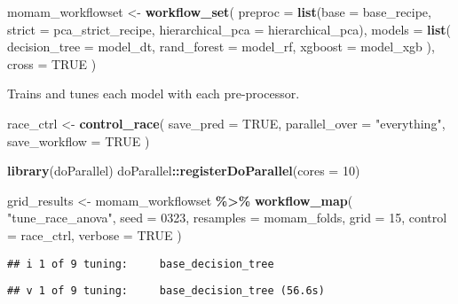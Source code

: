 \documentclass[
]{article}
\newenvironment{Shaded}{\begin{snugshade}}{\end{snugshade}}
\newcommand{\AttributeTok}[1]{\textcolor[rgb]{0.13,0.29,0.53}{#1}}
\newcommand{\ConstantTok}[1]{\textcolor[rgb]{0.56,0.35,0.01}{#1}}
\newcommand{\DecValTok}[1]{\textcolor[rgb]{0.00,0.00,0.81}{#1}}
\newcommand{\FunctionTok}[1]{\textcolor[rgb]{0.13,0.29,0.53}{\textbf{#1}}}
\newcommand{\NormalTok}[1]{#1}
\newcommand{\OtherTok}[1]{\textcolor[rgb]{0.56,0.35,0.01}{#1}}
\newcommand{\SpecialCharTok}[1]{\textcolor[rgb]{0.81,0.36,0.00}{\textbf{#1}}}
\newcommand{\StringTok}[1]{\textcolor[rgb]{0.31,0.60,0.02}{#1}}
\begin{document}
\begin{Shaded}
\begin{Highlighting}[]
\NormalTok{momam\_workflowset }\OtherTok{\textless{}{-}} \FunctionTok{workflow\_set}\NormalTok{(}
  \AttributeTok{preproc =} \FunctionTok{list}\NormalTok{(}\AttributeTok{base =}\NormalTok{ base\_recipe,}
                 \AttributeTok{strict =}\NormalTok{ pca\_strict\_recipe,}
                 \AttributeTok{hierarchical\_pca =}\NormalTok{ hierarchical\_pca),}
  \AttributeTok{models =} \FunctionTok{list}\NormalTok{(}
    \AttributeTok{decision\_tree =}\NormalTok{ model\_dt,}
    \AttributeTok{rand\_forest =}\NormalTok{ model\_rf,}
    \AttributeTok{xgboost =}\NormalTok{ model\_xgb}
\NormalTok{  ),}
  \AttributeTok{cross =} \ConstantTok{TRUE}
\NormalTok{)}
\end{Highlighting}
\end{Shaded}

Trains and tunes each model with each pre-processor.

\begin{Shaded}
\begin{Highlighting}[]
\NormalTok{race\_ctrl }\OtherTok{\textless{}{-}}
  \FunctionTok{control\_race}\NormalTok{(}
    \AttributeTok{save\_pred =} \ConstantTok{TRUE}\NormalTok{,}
    \AttributeTok{parallel\_over =} \StringTok{"everything"}\NormalTok{,}
    \AttributeTok{save\_workflow =} \ConstantTok{TRUE}
\NormalTok{  )}

\FunctionTok{library}\NormalTok{(doParallel)}
\NormalTok{doParallel}\SpecialCharTok{::}\FunctionTok{registerDoParallel}\NormalTok{(}\AttributeTok{cores =} \DecValTok{10}\NormalTok{)}

\NormalTok{grid\_results }\OtherTok{\textless{}{-}}
\NormalTok{  momam\_workflowset }\SpecialCharTok{\%\textgreater{}\%}
  \FunctionTok{workflow\_map}\NormalTok{(}
    \StringTok{"tune\_race\_anova"}\NormalTok{,}
    \AttributeTok{seed =} \DecValTok{0323}\NormalTok{,}
    \AttributeTok{resamples =}\NormalTok{ momam\_folds,}
    \AttributeTok{grid =} \DecValTok{15}\NormalTok{,}
    \AttributeTok{control =}\NormalTok{ race\_ctrl,}
    \AttributeTok{verbose =} \ConstantTok{TRUE}
\NormalTok{  )}
\end{Highlighting}
\end{Shaded}

\begin{verbatim}
## i 1 of 9 tuning:     base_decision_tree
\end{verbatim}

\begin{verbatim}
## v 1 of 9 tuning:     base_decision_tree (56.6s)
\end{verbatim}
\end{document}
